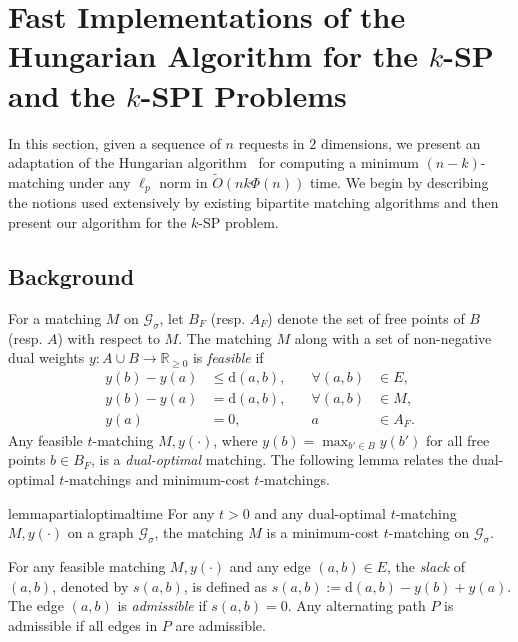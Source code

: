 \documentclass[11pt,onecolumn]{article}
\def\mcG{{\mathcal{G}}}
\def\mbR{{\mathbb{R}}}
\newcommand{\distance}[2]{\mathrm{d}(#1, #2)}
\newcommand{\requests}{\sigma}
\begin{document}
%
\section{Fast Implementations of the Hungarian Algorithm for the \texorpdfstring{$k$}{-}-SP and the \texorpdfstring{$k$}{-}-SPI Problems}\label{sec:nk-algod}
In this section, given a sequence of $n$ requests in $2$ dimensions, we present an adaptation of the Hungarian algorithm~\cite{kuhn1955hungarian} for computing a minimum $(n-k)$-matching under any $\ell_p$ norm in $\tilde{O}(nk\Phi(n))$ time.  We begin by describing the notions used extensively by existing bipartite matching algorithms and then present our algorithm for the $k$-SP problem.


\subsection{Background}
For a matching $M$ on $\mcG_\requests$, let $B_F$ (resp. $A_F$) denote the set of free points of $B$ (resp. $A$) with respect to $M$. The matching $M$ along with a set of non-negative dual weights $y:A\cup B\rightarrow \mbR_{\ge0}$ is \emph{feasible} if 
\begin{align}
    y(b) - y(a) &\le \distance{a}{b},&  \quad \forall(a,b)&\in E,\label{eq:dualfeasibility-non-matching}\\
    y(b) - y(a) &= \distance{a}{b},& \quad \forall(a,b)&\in M,\label{eq:dualfeasibility-matching}\\
    y(a) &= 0,& \quad a&\in A_F.\label{eq:dualfeasibility-free_a-nk}
\end{align}
%
%
%
%
Any feasible $t$-matching $M, y(\cdot)$, where $y(b)=\max_{b'\in B} y(b')$ for all free points $b\in B_F$, is a \emph{dual-optimal} matching. 
The following lemma relates the dual-optimal $t$-matchings and minimum-cost $t$-matchings.

\begin{restatable}{lemma}{partialoptimaltime}\label{lemma:partial-optimal-time}
    For any $t>0$ and any dual-optimal $t$-matching $M, y(\cdot)$ on a graph $\mcG_\requests$, the matching $M$ is a minimum-cost $t$-matching on $\mcG_\requests$.
\end{restatable}


For any feasible matching $M, y(\cdot)$ and any edge $(a,b)\in E$, the \emph{slack} of $(a,b)$, denoted by $s(a,b)$, is defined as $s(a,b):=\distance{a}{b} - y(b) + y(a)$. The edge $(a,b)$ is \emph{admissible} if $s(a,b)=0$. Any alternating path $P$ is admissible if all edges in $P$ are admissible. 
\end{document}
